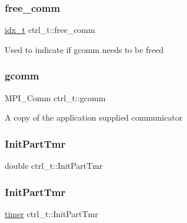 \mbox{\label{structctrl__t_aab19c0f9f0acd534d86498a9217f95e5}} 
\subsubsection{\texorpdfstring{free\+\_\+comm}{free\_comm}}
{\footnotesize\ttfamily \hyperlink{3rd_party_2parmetis-4_80_83_2metis_2include_2metis_8h_aaa5262be3e700770163401acb0150f52}{idx\+\_\+t} ctrl\+\_\+t\+::free\+\_\+comm}

Used to indicate if gcomm needs to be freed \mbox{\label{structctrl__t_aeb4b28f44dc445407a23443c96c85489}} 
\subsubsection{\texorpdfstring{gcomm}{gcomm}}
{\footnotesize\ttfamily M\+P\+I\+\_\+\+Comm ctrl\+\_\+t\+::gcomm}

A copy of the application supplied communicator \mbox{\label{structctrl__t_aaa34977233d81aa867a7dca9fb095747}} 
\subsubsection{\texorpdfstring{Init\+Part\+Tmr}{InitPartTmr}\hspace{0.1cm}{\footnotesize\ttfamily [1/2]}}
{\footnotesize\ttfamily double ctrl\+\_\+t\+::\+Init\+Part\+Tmr}

\mbox{\label{structctrl__t_a1a0b3969ee6948842f7411599747326d}} 
\subsubsection{\texorpdfstring{Init\+Part\+Tmr}{InitPartTmr}\hspace{0.1cm}{\footnotesize\ttfamily [2/2]}}
{\footnotesize\ttfamily \hyperlink{libparmetis_2struct_8h_aae821c36bb7e6918e1414484f939c3d4}{timer} ctrl\+\_\+t\+::\+Init\+Part\+Tmr}

